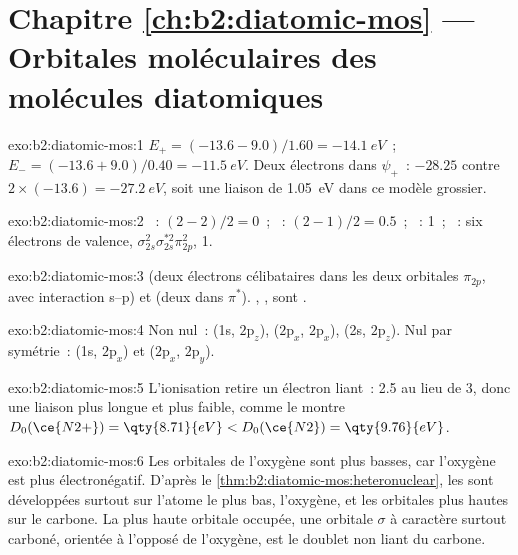 \section*{Chapitre \ref{ch:b2:diatomic-mos} --- Orbitales moléculaires des molécules diatomiques}

\begin{solution}{exo:b2:diatomic-mos:1}
$E_+ = (-13.6 - 9.0)/1.60 = \qty{-14.1}{eV}$~; $E_- = (-13.6 + 9.0)/0.40 = \qty{-11.5}{eV}$.
Deux électrons dans $\psi_+$~: $-28.25$ contre $2 \times (-13.6) = \qty{-27.2}{eV}$, soit une liaison de
\qty{1.05}{eV} dans ce modèle grossier.
\end{solution}

\begin{solution}{exo:b2:diatomic-mos:2}
~: $(2 - 2)/2 = 0$~; ~: $(2 - 1)/2 = 0.5$~; ~: 1~; ~: six électrons de
valence, $\sigma_{2s}^2\sigma_{2s}^{*2}\pi_{2p}^2$,  1.
\end{solution}

\begin{solution}{exo:b2:diatomic-mos:3}
 (deux électrons célibataires dans les deux orbitales $\pi_{2p}$, avec interaction s--p) et
 (deux dans $\pi^*$). , ,  sont .
\end{solution}

\begin{solution}{exo:b2:diatomic-mos:4}
Non nul~: (1s, $2\mathrm p_z$), ($2\mathrm p_x$, $2\mathrm p_x$), (2s, $2\mathrm p_z$).
Nul par symétrie~: (1s, $2\mathrm p_x$) et ($2\mathrm p_x$, $2\mathrm p_y$).
\end{solution}

\begin{solution}{exo:b2:diatomic-mos:5}
L'ionisation retire un électron liant~:  2.5 au lieu de 3, donc une liaison plus longue et
plus faible, comme le montre $D_0(\ce{N2+}) = \qty{8.71}{eV} < D_0(\ce{N2}) = \qty{9.76}{eV}$.
\end{solution}

\begin{solution}{exo:b2:diatomic-mos:6}
Les orbitales de l'oxygène sont plus basses, car l'oxygène est plus électronégatif. D'après
le \cref{thm:b2:diatomic-mos:heteronuclear}, les  sont développées surtout sur
l'atome le plus bas, l'oxygène, et les orbitales plus hautes sur le carbone. La plus haute orbitale
occupée, une orbitale $\sigma$ à caractère surtout carboné, orientée à l'opposé de l'oxygène, est
le doublet non liant du carbone.
\end{solution}

